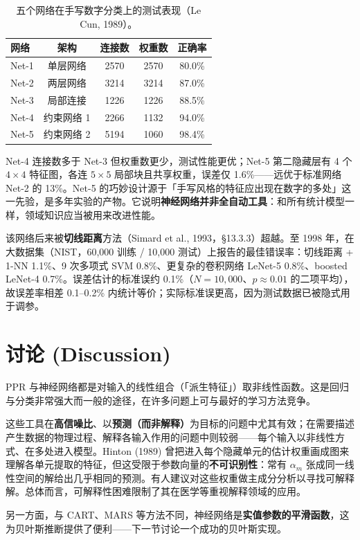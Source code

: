 \begin{table}[htbp]
\centering
\caption{五个网络在手写数字分类上的测试表现（Le Cun, 1989）。}
\label{tab:11_1}
\begin{tabular}{lcccc}
\toprule
网络 & 架构 & 连接数 & 权重数 & 正确率 \\
\midrule
Net-1 & 单层网络 & 2570 & 2570 & 80.0\% \\
Net-2 & 两层网络 & 3214 & 3214 & 87.0\% \\
Net-3 & 局部连接 & 1226 & 1226 & 88.5\% \\
Net-4 & 约束网络 1 & 2266 & 1132 & 94.0\% \\
Net-5 & 约束网络 2 & 5194 & 1060 & 98.4\% \\
\bottomrule
\end{tabular}
\end{table}

\begin{remark}[结果与启示]
Net-4 连接数多于 Net-3 但权重数更少，测试性能更优；Net-5 第二隐藏层有 4 个 $4\times 4$ 特征图，各连 $5\times 5$ 局部块且共享权重，误差仅 1.6\%——远优于标准网络 Net-2 的 13\%。Net-5 的巧妙设计源于「手写风格的特征应出现在数字的多处」这一先验，是多年实验的产物。它说明\textbf{神经网络并非全自动工具}：和所有统计模型一样，领域知识应当被用来改进性能。

该网络后来被\textbf{切线距离}方法（Simard et al., 1993，§13.3.3）超越。至 1998 年，在大数据集（NIST，60{,}000 训练 / 10{,}000 测试）上报告的最佳错误率：切线距离 + 1-NN 1.1\%、9 次多项式 SVM 0.8\%、更复杂的卷积网络 LeNet-5 0.8\%、boosted LeNet-4 0.7\%。误差估计的标准误约 0.1\%（$N=10{,}000$、$p\approx 0.01$ 的二项平均），故误差率相差 0.1--0.2\% 内统计等价；实际标准误更高，因为测试数据已被隐式用于调参。
\end{remark}

\section{讨论 (Discussion)}

PPR 与神经网络都是对输入的线性组合（「派生特征」）取非线性函数。这是回归与分类非常强大而一般的途径，在许多问题上可与最好的学习方法竞争。

\begin{remark}[适用场景与局限]
这些工具在\textbf{高信噪比}、以\textbf{预测（而非解释）}为目标的问题中尤其有效；在需要描述产生数据的物理过程、解释各输入作用的问题中则较弱——每个输入以非线性方式、在多处进入模型。Hinton (1989) 曾把进入每个隐藏单元的估计权重画成图来理解各单元提取的特征，但这受限于参数向量的\textbf{不可识别性}：常有 $\alpha_m$ 张成同一线性空间的解给出几乎相同的预测。有人建议对这些权重做主成分分析以寻找可解释解。总体而言，可解释性困难限制了其在医学等重视解释领域的应用。

另一方面，与 CART、MARS 等方法不同，神经网络是\textbf{实值参数的平滑函数}，这为贝叶斯推断提供了便利——下一节讨论一个成功的贝叶斯实现。
\end{remark}

